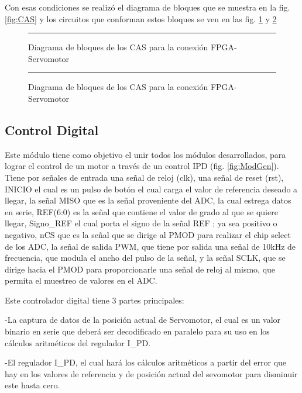 \documentclass[12pt,a4paper]{article} %
\begin{document}
Con esas condiciones se realizó el diagrama de bloques que se muestra en la fig. \ref{fig:CAS} y los circuitos que conforman estos bloques se ven en las fig. \ref{fig:CAS1im} y \ref{fig:CAS2im}

\begin{figure}[htbp]
  \centering
    \rule{35em}{0.3pt}
  \caption[CAS1im]{Diagrama de bloques de los CAS para la conexión FPGA-Servomotor}
  \label{fig:CAS1im}
\end{figure}

\begin{figure}[htbp]
  \centering
    \rule{35em}{0.3pt}
  \caption[CAS2im]{Diagrama de bloques de los CAS para la conexión FPGA-Servomotor}
  \label{fig:CAS2im}
\end{figure}

\subsection{Control Digital}

Este módulo tiene como objetivo el unir todos los módulos desarrollados, para lograr el control de un motor a través de un control IPD (fig. \ref{fig:ModGen}). Tiene por señales de entrada una señal de reloj (clk), una señal de reset (rst), INICIO el cual es un pulso de botón el cual carga el valor de referencia deseado a llegar, la señal MISO que es la señal proveniente del ADC, la cual estrega datos en serie, REF(6:0) es la señal que contiene el valor de grado al que se quiere llegar, Signo\_REF el cual porta el signo de la señal REF ; ya sea positivo o negativo, nCS que es la señal que se dirige al PMOD para realizar el chip select de los ADC, la señal de salida PWM, que tiene por salida una señal de 10kHz de frecuencia, que modula el ancho del pulso de la señal, y la señal SCLK, que se dirige hacia el PMOD para proporcionarle una señal de reloj al mismo, que permita el muestreo de valores en el ADC.

Este controlador digital tiene 3 partes principales:

-La captura de datos de la posición actual de Servomotor, el cual es un valor binario en serie que deberá ser decodificado en paralelo para su uso  en los cálculos aritméticos del regulador I\_PD.

-El regulador I\_PD, el cual hará los cálculos aritméticos a partir del error que hay en los valores de referencia y de posición actual del sevomotor para disminuir este hasta cero.
\end{document}
